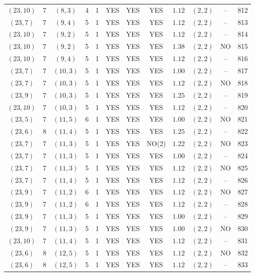 \begin{longtable}{|c|c|c|c|c|c|c|c|c|c|c|c|}
$(23,10)$ & 7 & $(8,3)$ & 4 & 1 & YES & YES & YES & $1.12$ & $(2,2)$ & -- & 812\\
$(23,7)$ & 7 & $(9,4)$ & 5 & 1 & YES & YES & YES & $1.12$ & $(2,2)$ & -- & 813\\
$(23,10)$ & 7 & $(9,2)$ & 5 & 1 & YES & YES & YES & $1.12$ & $(2,2)$ & -- & 814\\
$(23,10)$ & 7 & $(9,2)$ & 5 & 1 & YES & YES & YES & $1.38$ & $(2,2)$ & NO & 815\\
$(23,10)$ & 7 & $(9,4)$ & 5 & 1 & YES & YES & YES & $1.12$ & $(2,2)$ & -- & 816\\
$(23,7)$ & 7 & $(10,3)$ & 5 & 1 & YES & YES & YES & $1.00$ & $(2,2)$ & -- & 817\\
$(23,7)$ & 7 & $(10,3)$ & 5 & 1 & YES & YES & YES & $1.12$ & $(2,2)$ & NO & 818\\
$(23,9)$ & 7 & $(10,3)$ & 5 & 1 & YES & YES & YES & $1.25$ & $(2,2)$ & -- & 819\\
$(23,10)$ & 7 & $(10,3)$ & 5 & 1 & YES & YES & YES & $1.12$ & $(2,2)$ & -- & 820\\
$(23,5)$ & 7 & $(11,5)$ & 6 & 1 & YES & YES & YES & $1.00$ & $(2,2)$ & NO & 821\\
$(23,6)$ & 8 & $(11,4)$ & 5 & 1 & YES & YES & YES & $1.25$ & $(2,2)$ & -- & 822\\
$(23,7)$ & 7 & $(11,3)$ & 5 & 1 & YES & YES & NO(2) & $1.22$ & $(2,2)$ & NO & 823\\
$(23,7)$ & 7 & $(11,3)$ & 5 & 1 & YES & YES & YES & $1.00$ & $(2,2)$ & -- & 824\\
$(23,7)$ & 7 & $(11,3)$ & 5 & 1 & YES & YES & YES & $1.12$ & $(2,2)$ & NO & 825\\
$(23,7)$ & 7 & $(11,4)$ & 5 & 1 & YES & YES & YES & $1.12$ & $(2,2)$ & -- & 826\\
$(23,9)$ & 7 & $(11,2)$ & 6 & 1 & YES & YES & YES & $1.12$ & $(2,2)$ & NO & 827\\
$(23,9)$ & 7 & $(11,2)$ & 6 & 1 & YES & YES & YES & $1.12$ & $(2,2)$ & -- & 828\\
$(23,9)$ & 7 & $(11,3)$ & 5 & 1 & YES & YES & YES & $1.00$ & $(2,2)$ & -- & 829\\
$(23,9)$ & 7 & $(11,3)$ & 5 & 1 & YES & YES & YES & $1.00$ & $(2,2)$ & NO & 830\\
$(23,10)$ & 7 & $(11,4)$ & 5 & 1 & YES & YES & YES & $1.12$ & $(2,2)$ & -- & 831\\
$(23,6)$ & 8 & $(12,5)$ & 5 & 1 & YES & YES & YES & $1.12$ & $(2,2)$ & NO & 832\\
$(23,6)$ & 8 & $(12,5)$ & 5 & 1 & YES & YES & YES & $1.12$ & $(2,2)$ & -- & 833\\

\end{longtable}
